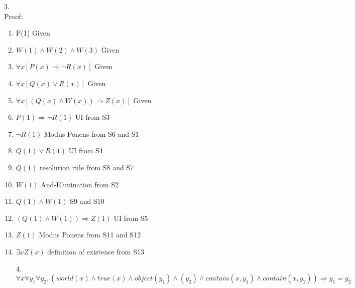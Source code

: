 \documentclass[a4paper]{article}
\begin{document}
3.\\
Proof:\\
\begin{enumerate}[1.]
\item P(1) \hfill Given
\item $W(1)\wedge W(2) \wedge W(3)$  \hfill Given
\item $\forall x[P(x)\Rightarrow \neg R(x)]$ \hfill Given
\item $\forall x[Q(x)\vee R(x)]$ \hfill Given
\item $\forall x[(Q(x)\wedge W(x)) \Rightarrow Z(x)]$ \hfill Given
\item $P(1) \Rightarrow \neg R(1)$ \hfill UI from S3
\item $\neg R(1)$ \hfill Modus Ponens from S6 and S1
\item $Q(1)\vee R(1)$ \hfill UI from S4
\item $Q(1)$ \hfill resolution rule from S8 and S7
\item $W(1)$ \hfill And-Elimination from S2
\item $Q(1)\wedge W(1)$ \hfill S9 and S10
\item $(Q(1)\wedge W(1)) \Rightarrow Z(1)$ \hfill UI from S5
\item $Z(1)$ \hfill Modus Ponens from S11 and S12
\item $\exists xZ(x)$ \hfill definition of existence from S13

4.\\
$\forall x \forall y_1 \forall y_2, (world(x)\wedge true(x)\wedge object(y_1) \wedge(y_2) \wedge contain(x, y_1) \wedge contain(x, y_2)) \Rightarrow y_1 = y_2$


\end{enumerate}
\end{document}
